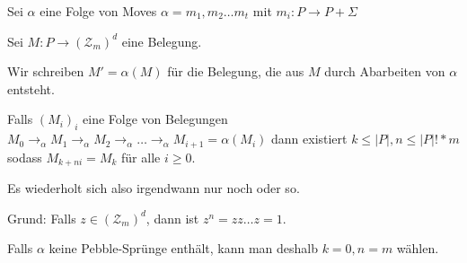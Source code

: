 \begin{lemma}

    Sei $\alpha$ eine Folge von Moves $\alpha = m_1, m_2 \dots m_t$ mit $m_i: P \rightarrow P + \Sigma$


    Sei $M: P \rightarrow (\mathcal{Z}_m)^d$ eine Belegung. 

    Wir schreiben $M' = \alpha(M)$ für die Belegung, die aus $M$ durch Abarbeiten von $\alpha$ entsteht.

    Falls $(M_i)_i$ eine Folge von Belegungen
    $M_0 \rightarrow_\alpha M_1 \rightarrow_\alpha M_2 \rightarrow_\alpha \dots \rightarrow_\alpha M_{i+1} = \alpha(M_i)$
    dann existiert $k \leq |P|, n \leq |P|! * m $ sodass $M_{k+ni} = M_k$ für alle $i \geq 0$.

    Es wiederholt sich also irgendwann nur noch oder so.


    Grund: Falls $z \in (\mathcal{Z}_m)^d$, dann ist $z^n = z z \dots z = 1$.

    Falls $\alpha$ keine Pebble-Sprünge enthält, kann man deshalb $k = 0, n = m$ wählen.
    
\end{lemma}





